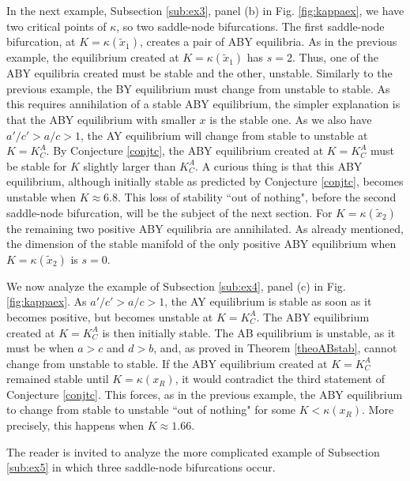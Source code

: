 \documentclass[12pt]{article}
\theoremstyle{definition}
\begin{document}
In the next example, Subsection \ref{sub:ex3}, panel (b) in Fig. \ref{fig:kappaex}, we have two critical points of $\kappa$, so two saddle-node bifurcations. The first saddle-node bifurcation, at $K=\kappa(\tilde{x}_1)$, creates a pair of ABY equilibria. As in the previous example, the equilibrium created at $K=\kappa(\tilde{x}_1)$ has $s=2$. Thus, one of the ABY equilibria created must be stable and the other, unstable. Similarly to the previous example, the BY equilibrium must change from unstable to stable. As this requires annihilation of a stable ABY equilibrium, the simpler explanation is that the ABY equilibrium with smaller $x$ is the stable one. As we also have $a'/c'>a/c>1$, the AY equilibrium will change from stable to unstable at $K=K^A_C$. By Conjecture \ref{conjtc}, the ABY equilibrium created at $K=K^A_C$ must be stable for $K$ slightly larger than $K^A_C$. A curious thing is that this ABY equilibrium, although initially stable as predicted by Conjecture \ref{conjtc}, becomes unstable when $K \approx 6.8$. This loss of stability ``out of nothing", before the second saddle-node bifurcation, will be the subject of the next section. For $K=\kappa(\tilde{x}_2)$ the remaining two positive ABY equilibria are annihilated. As already mentioned, the dimension of the stable manifold of the only positive ABY equilibrium when $K=\kappa(\tilde{x}_2)$ is $s=0$.

We now analyze the example of Subsection \ref{sub:ex4}, panel (c) in Fig. \ref{fig:kappaex}. As $a'/c'>a/c>1$, the AY equilibrium is stable as soon as it becomes positive, but becomes unstable at $K=K^A_C$. The ABY equilibrium created at $K=K^A_C$ is then initially stable. The AB equilibrium is unstable, as it must be when $a>c$ and $d>b$, and, as proved in Theorem \ref{theoABstab}, cannot change from unstable to stable. If the ABY equilibrium created at $K=K^A_C$ remained stable until $K=\kappa(x_R)$, it would contradict the third statement of Conjecture \ref{conjtc}. This forces, as in the previous example, the ABY equilibrium to change from stable to unstable ``out of nothing" for some $K<\kappa(x_R)$. More precisely, this happens when $K \approx 1.66$.

The reader is invited to analyze the more complicated example of Subsection \ref{sub:ex5} in which three saddle-node bifurcations occur.
\end{document}
